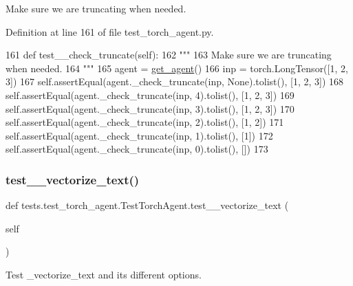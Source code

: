 \begin{DoxyVerb}Make sure we are truncating when needed.
\end{DoxyVerb}
 

Definition at line 161 of file test\+\_\+torch\+\_\+agent.\+py.


\begin{DoxyCode}
161     \textcolor{keyword}{def }test\_\_check\_truncate(self):
162         \textcolor{stringliteral}{"""}
163 \textcolor{stringliteral}{        Make sure we are truncating when needed.}
164 \textcolor{stringliteral}{        """}
165         agent = \hyperlink{namespacetests_1_1test__torch__agent_ae929d109305aaea29fbfa13ecf1f32e9}{get\_agent}()
166         inp = torch.LongTensor([1, 2, 3])
167         self.assertEqual(agent.\_check\_truncate(inp, \textcolor{keywordtype}{None}).tolist(), [1, 2, 3])
168         self.assertEqual(agent.\_check\_truncate(inp, 4).tolist(), [1, 2, 3])
169         self.assertEqual(agent.\_check\_truncate(inp, 3).tolist(), [1, 2, 3])
170         self.assertEqual(agent.\_check\_truncate(inp, 2).tolist(), [1, 2])
171         self.assertEqual(agent.\_check\_truncate(inp, 1).tolist(), [1])
172         self.assertEqual(agent.\_check\_truncate(inp, 0).tolist(), [])
173 
\end{DoxyCode}
\mbox{\label{classtests_1_1test__torch__agent_1_1TestTorchAgent_a9bce672782a5d1408c104fd89d2d403f}} 
\subsubsection{\texorpdfstring{test\+\_\+\+\_\+vectorize\+\_\+text()}{test\_\_vectorize\_text()}}
{\footnotesize\ttfamily def tests.\+test\+\_\+torch\+\_\+agent.\+Test\+Torch\+Agent.\+test\+\_\+\+\_\+vectorize\+\_\+text (\begin{DoxyParamCaption}\item[{}]{self }\end{DoxyParamCaption})}

\begin{DoxyVerb}Test _vectorize_text and its different options.
\end{DoxyVerb}
 

